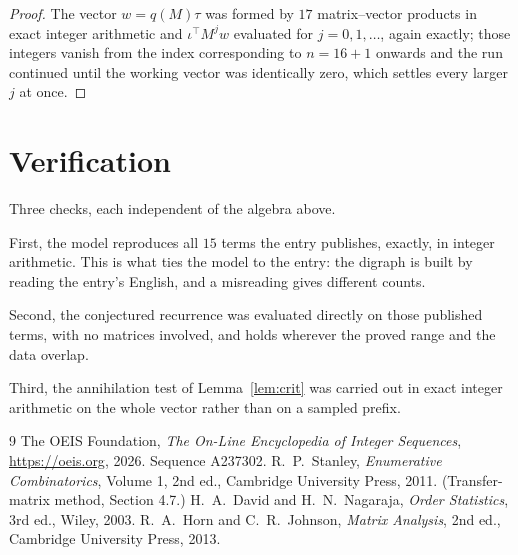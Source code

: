 \documentclass[11pt,a4paper]{article}
\theoremstyle{plain}
\theoremstyle{definition}
\begin{document}
\begin{proof}
The vector $w=q(M)\tau$ was formed by $17$ matrix--vector products in exact integer
arithmetic and $\iota^{\!\top}M^{j}w$ evaluated for $j=0,1,\dots$, again exactly; those
integers vanish from the index corresponding to $n=16+1$ onwards and the run continued
until the working vector was identically zero, which settles every larger $j$ at once.
\end{proof}

\section{Verification}

Three checks, each independent of the algebra above.

First, the model reproduces all $15$ terms the entry publishes, exactly, in integer
arithmetic. This is what ties the model to the entry: the digraph is built by reading the
entry's English, and a misreading gives different counts.

Second, the conjectured recurrence was evaluated directly on those published terms, with no
matrices involved, and holds wherever the proved range and the data overlap.

Third, the annihilation test of Lemma~\ref{lem:crit} was carried out in exact integer
arithmetic on the whole vector rather than on a sampled prefix.

\begin{thebibliography}{9}
 The OEIS Foundation, \emph{The On-Line Encyclopedia of Integer
Sequences}, \url{https://oeis.org}, 2026. Sequence A237302.
 R.~P.~Stanley, \emph{Enumerative Combinatorics}, Volume 1, 2nd ed.,
Cambridge University Press, 2011. (Transfer-matrix method, Section 4.7.)
 H.~A.~David and H.~N.~Nagaraja, \emph{Order Statistics}, 3rd ed., Wiley,
2003.
 R.~A.~Horn and C.~R.~Johnson, \emph{Matrix Analysis}, 2nd ed., Cambridge
University Press, 2013.
\end{thebibliography}
\end{document}
